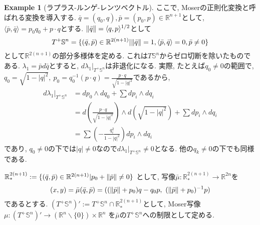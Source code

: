 \documentclass[a4paper]{ujarticle}
\numberwithin{equation}{section}
\theoremstyle{definition}
\newtheorem{example}{Example}
\begin{document}
\begin{example}[ラプラス-ルンゲ-レンツベクトル]
            ここで, Moserの正則化変換と呼ばれる変換を導入する.
            $\bar{q} = (q_0, q), \bar{p} = (p_0, p) \in \mathbb{R}^{n+1}$として, $\langle \bar{p}, \bar{q}\rangle = p_0 q_0 + p \cdot q$とする.
            $\norm{\bar{q}} = \langle q, p\rangle^{1/2}$として
            \[
                T^{+}\mathbb{S}^{n} = \{(\bar{q}, \bar{p}) \in \mathbb{R}^{2(n+1)} | \norm{\bar{q}} = 1, \langle \bar{p}, \bar{q} \rangle = 0, \bar{p} \neq 0\}
            \]
            として$\mathbb{R}^{2(n + 1)}$の部分多様体を定める. これは$T \mathbb{S}^{n}$からゼロ切断を除いたものである.
            $\lambda_1 = \bar{p} d\bar{q}$とすると, $d \lambda_1 |_{T^{+}\mathbb{S}^{n}}$は非退化になる.
            実際, たとえば$q_0 \neq 0$の範囲で, 
            $\displaystyle q_0 = \sqrt{1 - |q|^2}, \ p_0 = q_0^{-1} (p \cdot q) = \frac{p \cdot q}{\sqrt{1 - |q|^2}}$であるから, 
            \begin{align}
                d \lambda_1 |_{T^{+}\mathbb{S}^{n}}
                &= d p_0 \wedge d q_0 + \sum d p_i \wedge d q_i \\
                &= d \left( \frac{p \cdot q}{\sqrt{1 - |q|^2}} \right) \wedge d(\sqrt{1 - |q|^2}) + \sum d p_i \wedge d q_i \\
                &= \sum \left( - \frac{q_i^2}{1 - |q|^2}\right) d p_i \wedge d q_i 
            \end{align}
            であり, $q_0 \neq 0$の下では$|q| \neq 0$なので$d \lambda_1 |_{T^{+}\mathbb{S}^{n}} \neq 0$となる.
            他の$q_k \neq 0$の下でも同様である.

            $\mathbb{R}^{2(n+1)}_{*} := \{(\bar{q}, \bar{p}) \in \mathbb{R}^{2(n+1)} | p_0 + \norm{\bar{p}} \neq 0\}$
            として, 写像$\bar{\mu} : \mathbb{R}^{2(n+1)}_{*} \rightarrow \mathbb{R}^{2n}$を
            \[
                (x, y) = \bar{\mu}(\bar{q}, \bar{p}) = ((\norm{\bar{p}} + p_0) q - q_0 p, \ (\norm{\bar{p}} + p_0)^{-1} p)
            \]
            であるとする. 
            $(T^{+} \mathbb{S}^{n})' := T^{+} \mathbb{S}^{n} \cap \mathbb{R}^{2(n+1)}_{*}$として,
            Moser写像$\mu: (T^{+} \mathbb{S}^{n})' \rightarrow (\mathbb{R}^{n} \backslash \{0\}) \times \mathbb{R}^{n}$
            を$\bar{\mu}$の$T^{+} \mathbb{S}^{n}$への制限として定める. 
            

\end{example}
\end{document}
